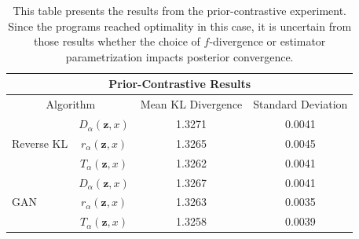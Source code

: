 \documentclass[honours,12pt, twoside]{unswthesis}
\numberwithin{equation}{section}
\theoremstyle{definition}
\begin{document}
\begin{table}[t!]
\centering
\begin{tabular}{|l|c|c|c|}
\hline
\multicolumn{4}{|c|}{Prior-Contrastive Results}\\
\hline
\multicolumn{2}{|c|}{Algorithm} & Mean KL Divergence & Standard Deviation\\
\hline
\multirow{3}{*}{Reverse KL} & $D_\alpha(\bm{z},x)$ & 1.3271 & 0.0041\\
\cline{2-4}
& $r_\alpha(\bm{z},x)$ & 1.3265 & 0.0045\\
\cline{2-4}
& $T_\alpha(\bm{z},x)$ & 1.3262 & 0.0041\\
\hline
\multirow{3}{*}{GAN} & $D_\alpha(\bm{z},x)$ & 1.3267 & 0.0041\\
\cline{2-4}
& $r_\alpha(\bm{z},x)$ & 1.3263 & 0.0035\\
\cline{2-4}
& $T_\alpha(\bm{z},x)$ & 1.3258 & 0.0039\\
\hline
\end{tabular}
\caption{\small This table presents the results from the prior-contrastive experiment. Since the programs reached optimality in this case, it is uncertain from those results whether the choice of $f$-divergence or estimator parametrization impacts posterior convergence.}
\label{tab:6.1}
\end{table}
\end{document}
